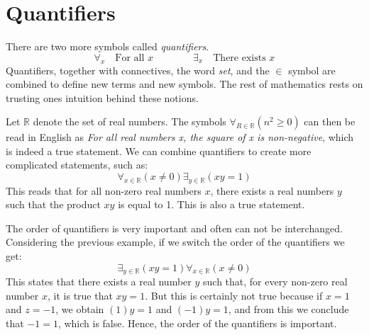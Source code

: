 \section{Quantifiers}
    There are two more symbols called
    \textit{\glspl{quantifier}}.
    \begin{equation*}
        \forall_{x}\quad\textrm{For all }x
        \quad\quad\quad\quad
        \exists_{x}\quad\textrm{There exists }x
    \end{equation*}
    Quantifiers, together with connectives, the word \textit{set}, and the
    $\in$ symbol are combined to define new terms and new symbols. The rest
    of mathematics rests on trusting ones intuition behind these notions.
    \begin{example}
        Let $\mathbb{R}$ denote the set of real numbers. The symbols
        $\forall_{R\in\mathbb{R}}(n^{2}\geq{0})$ can then be read in English
        as \textit{For all real numbers x, the square of x is non-negative},
        which is indeed a true statement. We can combine quantifiers to
        create more complicated statements, such as:
        \begin{equation}
            \forall_{x\in\mathbb{R}}(x\ne{0})\exists_{y\in\mathbb{R}}(xy=1)
        \end{equation}
        This reads that for all non-zero real numbers $x$, there exists a
        real numbers $y$ such that the product $xy$ is equal to 1. This is
        also a true statement.
    \end{example}
    \begin{example}
        The order of quantifiers is very important and often can not be
        interchanged. Considering the previous example, if we switch the
        order of the quantifiers we get:
        \begin{equation}
            \exists_{y\in\mathbb{R}}(xy=1)\forall_{x\in\mathbb{R}}(x\ne{0})
        \end{equation}
        This states that there exists a real number $y$ such that, for every
        non-zero real number $x$, it is true that $xy=1$. But this is
        certainly not true because if $x=1$ and $z=\minus{1}$, we obtain
        $(1)y=1$ and $(\minus{1})y=1$, and from this we conclude that
        $\minus{1}=1$, which is false. Hence, the order of the quantifiers
        is important.
    \end{example}
